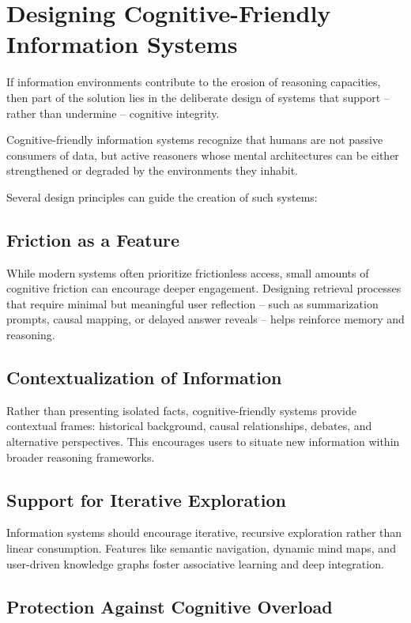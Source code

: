 \section{Designing Cognitive-Friendly Information Systems}

If information environments contribute to the erosion of reasoning
capacities, then part of the solution lies in the deliberate design of
systems that support -- rather than undermine -- cognitive integrity.

Cognitive-friendly information systems recognize that humans are not
passive consumers of data, but active reasoners whose mental
architectures can be either strengthened or degraded by the environments
they inhabit.

Several design principles can guide the creation of such systems:

\subsection{Friction as a Feature}

While modern systems often prioritize frictionless access, small amounts
of cognitive friction can encourage deeper engagement. Designing
retrieval processes that require minimal but meaningful user reflection
-- such as summarization prompts, causal mapping, or delayed answer
reveals -- helps reinforce memory and reasoning.

\subsection{Contextualization of Information}

Rather than presenting isolated facts, cognitive-friendly systems
provide contextual frames: historical background, causal relationships,
debates, and alternative perspectives. This encourages users to situate
new information within broader reasoning frameworks.

\subsection{Support for Iterative Exploration}

Information systems should encourage iterative, recursive exploration
rather than linear consumption. Features like semantic navigation,
dynamic mind maps, and user-driven knowledge graphs foster associative
learning and deep integration.

\subsection{Protection Against Cognitive Overload}

